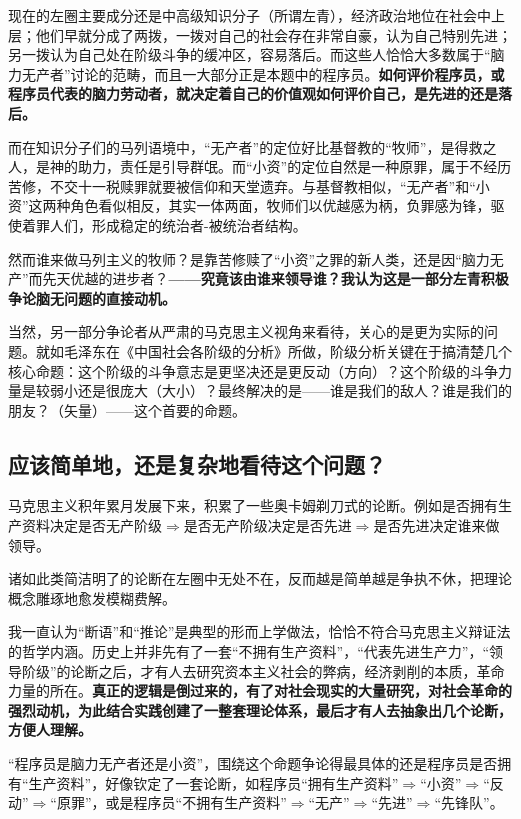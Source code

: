 \documentclass[punct=kaiming, zihao=5, openany, fontset=sikou]{ctexbook}
\begin{document}
现在的左圈主要成分还是中高级知识分子（所谓左青），经济政治地位在社会中上层；他们早就分成了两拨，一拨对自己的社会存在非常自豪，认为自己特别先进；另一拨认为自己处在阶级斗争的缓冲区，容易落后。而这些人恰恰大多数属于“脑力无产者”讨论的范畴，而且一大部分正是本题中的程序员。{\bfseries 如何评价程序员，或程序员代表的脑力劳动者，就决定着自己的价值观如何评价自己，是先进的还是落后。}

而在知识分子们的马列语境中，“无产者”的定位好比基督教的“牧师”，是得救之人，是神的助力，责任是引导群氓。而“小资”的定位自然是一种原罪，属于不经历苦修，不交十一税赎罪就要被信仰和天堂遗弃。与基督教相似，“无产者”和“小资”这两种角色看似相反，其实一体两面，牧师们以优越感为柄，负罪感为锋，驱使着罪人们，形成稳定的统治者-被统治者结构。

然而谁来做马列主义的牧师？是靠苦修赎了“小资”之罪的新人类，还是因“脑力无产”而先天优越的进步者？{\bfseries ——究竟该由谁来领导谁？我认为这是一部分左青积极争论脑无问题的直接动机。}

当然，另一部分争论者从严肃的马克思主义视角来看待，关心的是更为实际的问题。就如毛泽东在《中国社会各阶级的分析》所做，阶级分析关键在于搞清楚几个核心命题：这个阶级的斗争意志是更坚决还是更反动（方向）？这个阶级的斗争力量是较弱小还是很庞大（大小）？最终解决的是——谁是我们的敌人？谁是我们的朋友？（矢量）——这个首要的命题。

\subsection{应该简单地，还是复杂地看待这个问题？}
马克思主义积年累月发展下来，积累了一些奥卡姆剃刀式的论断。例如是否拥有生产资料决定是否无产阶级$\Rightarrow$是否无产阶级决定是否先进$\Rightarrow$是否先进决定谁来做领导。

诸如此类简洁明了的论断在左圈中无处不在，反而越是简单越是争执不休，把理论概念雕琢地愈发模糊费解。

我一直认为“断语”和“推论”是典型的形而上学做法，恰恰不符合马克思主义辩证法的哲学内涵。历史上并非先有了一套“不拥有生产资料”，“代表先进生产力”，“领导阶级”的论断之后，才有人去研究资本主义社会的弊病，经济剥削的本质，革命力量的所在。{\bfseries 真正的逻辑是倒过来的，有了对社会现实的大量研究，对社会革命的强烈动机，为此结合实践创建了一整套理论体系，最后才有人去抽象出几个论断，方便人理解。}

“程序员是脑力无产者还是小资”，围绕这个命题争论得最具体的还是程序员是否拥有“生产资料”，好像钦定了一套论断，如程序员“拥有生产资料”$\Rightarrow$“小资”$\Rightarrow$“反动”$\Rightarrow$“原罪”，或是程序员“不拥有生产资料”$\Rightarrow$“无产”$\Rightarrow$“先进”$\Rightarrow$“先锋队”。
\end{document}
